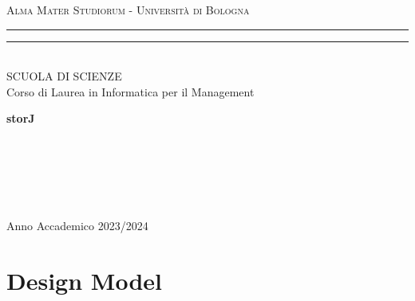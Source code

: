 \documentclass{article}
\begin{document}
\pagestyle{empty}

\begin{titlepage} 
\begin{center}
    {{\Large{\textsc{Alma Mater Studiorum - Università di Bologna}}}}
    \rule[0.1cm]{\textwidth}{0.1px}
    \rule[0.5cm]{\textwidth}{0.6px}\\
    {\large{SCUOLA DI SCIENZE \\ Corso di Laurea in Informatica per il Management}}
\end{center}

\vspace{50px}

\begin{center}
    {\LARGE{{\bf storJ}}}\
\end{center}

\vspace{115px}
\par
\noindent
\begin{minipage}[t]{0.04\textwidth}
~
\end{minipage}
\begin{minipage}[t]{0.4\textwidth}
\end{minipage}
\hfill
\begin{minipage}[t]{0.4\textwidth}\raggedleft
    {\
}
\end{minipage}
\begin{minipage}[t]{0.04\textwidth}
~
\end{minipage}

\vspace*{210px}

\begin{center}
    \large{Anno Accademico 2023/2024}
\end{center}
\end{titlepage}

\section{Design Model}
\end{document}
